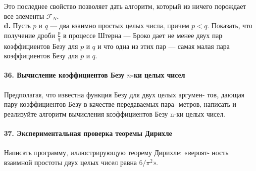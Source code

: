 Это последнее свойство позволяет дать алгоритм, который из ничего\linebreak
порождает все элементы $\mathcal{F}_N$.\\
\hspace*{10pt}\textbf{d.} Пусть $p$ и $q$ — два взаимно простых целых числа, причем $p < q$.\linebreak
Показать, что получение дроби $\frac{p}{q}$ в процессе Штерна — Броко дает не\linebreak
менее двух пар коэффициентов Безу для $p$ и $q$ и что одна из этих пар —\linebreak
самая малая пара коэффициентов Безу для $p$ и $q$.
\\
\\
\noindent\textbf{36. Вычисление коэффициентов Безу $n$-ки целых чисел}\\\\
\hspace*{10pt} Предполагая, что известна функция Безу для двух целых аргумен-\linebreak
тов, дающая пару коэффициентов Безу в качестве передаваемых пара-\linebreak
метров, написать и реализуйте алгоритм вычисления коэффициентов\linebreak
Безу n-ки целых чисел.
\\
\\
\noindent\textbf{37. Экспериментальная проверка теоремы Дирихле}\\\\
\hspace*{10pt} Написать программу, иллюстрирующую теорему Дирихле: «вероят-\linebreak
ность взаимной простоты двух целых чисел равна $6/\pi^2$».\pagebreak



